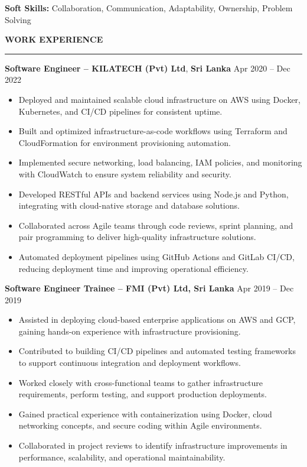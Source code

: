\documentclass[10pt,letterpaper]{article}
\begin{document}
\textbf{Soft Skills:} Collaboration, Communication, Adaptability, Ownership, Problem Solving

\vspace{8pt}

\textbf{WORK EXPERIENCE}\\[-8pt]
\noindent\rule{\textwidth}{1pt}

\vspace{-2pt}

\textbf{Software Engineer -- KILATECH (Pvt) Ltd}, \textbf{Sri Lanka} \hfill Apr 2020 -- Dec 2022

\vspace{-1pt}

\begin{itemize}
\item Deployed and maintained scalable cloud infrastructure on AWS using Docker, Kubernetes, and CI/CD pipelines for consistent uptime.
\item Built and optimized infrastructure-as-code workflows using Terraform and CloudFormation for environment provisioning automation.
\item Implemented secure networking, load balancing, IAM policies, and monitoring with CloudWatch to ensure system reliability and security.
\item Developed RESTful APIs and backend services using Node.js and Python, integrating with cloud-native storage and database solutions.
\item Collaborated across Agile teams through code reviews, sprint planning, and pair programming to deliver high-quality infrastructure solutions.
\item Automated deployment pipelines using GitHub Actions and GitLab CI/CD, reducing deployment time and improving operational efficiency.
\end{itemize}

\textbf{Software Engineer Trainee -- FMI (Pvt) Ltd, Sri Lanka} \hfill Apr 2019 -- Dec 2019

\vspace{-1pt}

\begin{itemize}
\item Assisted in deploying cloud-based enterprise applications on AWS and GCP, gaining hands-on experience with infrastructure provisioning.
\item Contributed to building CI/CD pipelines and automated testing frameworks to support continuous integration and deployment workflows.
\item Worked closely with cross-functional teams to gather infrastructure requirements, perform testing, and support production deployments.
\item Gained practical experience with containerization using Docker, cloud networking concepts, and secure coding within Agile environments.
\item Collaborated in project reviews to identify infrastructure improvements in performance, scalability, and operational maintainability.
\end{itemize}
\end{document}
